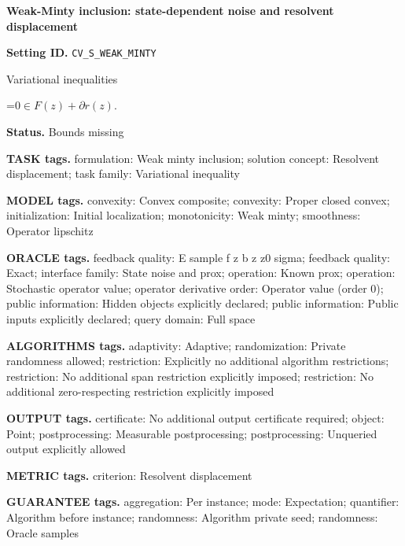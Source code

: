 \documentclass[10pt,a4paper]{article}
\newcommand{\AtlasMath}[1]{\par\begingroup\centering\setbox0=\hbox{$\displaystyle #1$}\ifdim\wd0>1.4\linewidth\typeout{ATLAS WIDE FORMULA: \the\wd0}\fi\ifdim\wd0>\linewidth\resizebox{\linewidth}{!}{\box0}\else\box0\fi\par\endgroup}
\begin{document}
\raggedright

{\LARGE\bfseries\sffamily\color{AtlasNavy} Weak-Minty inclusion: state-dependent noise and resolvent displacement\par}\vspace{5pt}


\textbf{Setting ID.} \texttt{CV\_\allowbreak{}S\_\allowbreak{}WEAK\_\allowbreak{}MINTY}



Variational inequalities




\AtlasMath{0\in F(z)+\partial r(z).}




\textbf{Status.} Bounds missing



\textbf{TASK tags.} formulation: Weak minty inclusion; solution concept: Resolvent displacement; task family: Variational inequality



\textbf{MODEL tags.} convexity: Convex composite; convexity: Proper closed convex; initialization: Initial localization; monotonicity: Weak minty; smoothness: Operator lipschitz



\textbf{ORACLE tags.} feedback quality: E sample f z b z z0 sigma; feedback quality: Exact; interface family: State noise and prox; operation: Known prox; operation: Stochastic operator value; operator derivative order: Operator value (order 0); public information: Hidden objects explicitly declared; public information: Public inputs explicitly declared; query domain: Full space



\textbf{ALGORITHMS tags.} adaptivity: Adaptive; randomization: Private randomness allowed; restriction: Explicitly no additional algorithm restrictions; restriction: No additional span restriction explicitly imposed; restriction: No additional zero-respecting restriction explicitly imposed



\textbf{OUTPUT tags.} certificate: No additional output certificate required; object: Point; postprocessing: Measurable postprocessing; postprocessing: Unqueried output explicitly allowed



\textbf{METRIC tags.} criterion: Resolvent displacement



\textbf{GUARANTEE tags.} aggregation: Per instance; mode: Expectation; quantifier: Algorithm before instance; randomness: Algorithm private seed; randomness: Oracle samples
\end{document}
